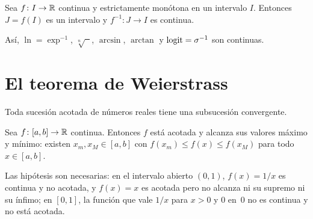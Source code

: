 \addtocounter{definicion}{1}%

\addtocounter{definicion}{1}%

\begin{teorema}\label{teo:inversa-continua}
Sea $f\colon I\to\mathbb{R}$ continua y estrictamente monótona en un intervalo $I$. Entonces $J=f(I)$ es un intervalo y $f^{-1}\colon J\to I$ es continua.
\end{teorema}

Así, $\ln=\exp^{-1}$, $\sqrt[n]{\phantom{x}}$, $\arcsin$, $\arctan$ y $\operatorname{logit}=\sigma^{-1}$ son continuas.

\section{El teorema de Weierstrass}

\begin{lema}\label{lem:bw}
Toda sucesión acotada de números reales tiene una subsucesión convergente.
\end{lema}

\begin{teorema}[Weierstrass]\label{teo:weierstrass}
Sea $f\colon[a,b]\to\mathbb{R}$ continua. Entonces $f$ está acotada y alcanza sus valores máximo y mínimo: existen $x_m,x_M\in[a,b]$ con $f(x_m)\le f(x)\le f(x_M)$ para todo $x\in[a,b]$.
\end{teorema}

Las hipótesis son necesarias: en el intervalo abierto $(0,1)$, $f(x)=1/x$ es continua y no acotada, y $f(x)=x$ es acotada pero no alcanza ni su supremo ni su ínfimo; en $[0,1]$, la función que vale $1/x$ para $x>0$ y $0$ en~$0$ no es continua y no está acotada.

\addtocounter{definicion}{1}%

\addtocounter{definicion}{1}%

